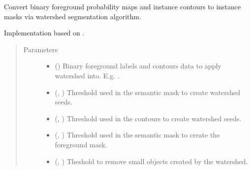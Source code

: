 \documentclass[letterpaper,10pt,english]{sphinxmanual}
\begin{document}

\begin{fulllineitems}
\label{\detokenize{data/post_processing/post_processing:data.post_processing.post_processing.bc_watershed}}
Convert binary foreground probability maps and instance contours to instance masks via watershed segmentation
algorithm.

Implementation based on .
\begin{quote}\begin{description}
\item[{Parameters}] \leavevmode\begin{itemize}
\item {} 
 () \textendash{} Binary foreground labels and contours data to apply watershed into. E.g. .

\item {} 
 (, ) \textendash{} Threshold used in the semantic mask to create watershed seeds.

\item {} 
 (, ) \textendash{} Threshold used in the contours to create watershed seeds.

\item {} 
 (, ) \textendash{} Threshold used in the semantic mask to create the foreground mask.

\item {} 
 (, ) \textendash{} Theshold to remove small objects created by the watershed.


\end{itemize}
\end{description}
\end{quote}
\end{fulllineitems}
\end{document}

